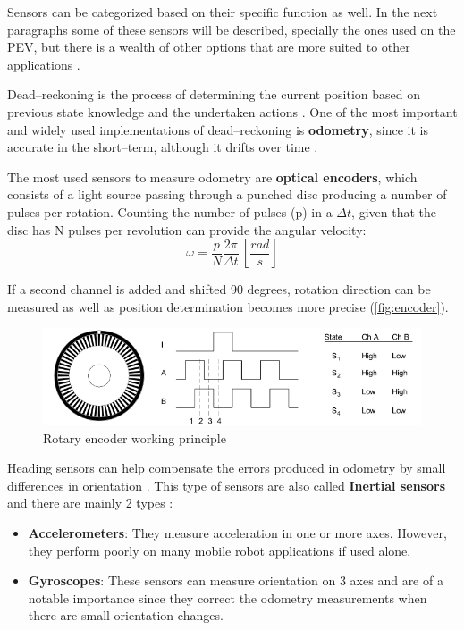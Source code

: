 Sensors can be categorized based on their specific function as well. In the next paragraphs some of these sensors will be described, specially the ones used on the PEV, but there is a wealth of other options that are more suited to other applications .

 Dead--reckoning is the process of determining the current position based on previous state knowledge and the undertaken actions . One of the most important and widely used implementations of dead--reckoning is \textbf{odometry}, since it is accurate in the short--term, although it drifts over time . 

The most used sensors to measure odometry are \textbf{optical encoders}, which consists of a light source passing through a punched disc producing a number of pulses per rotation. Counting the number of pulses (p) in a $\Delta t$, given that the disc has N pulses per revolution can provide the angular velocity:
\begin{equation}
  \omega = \frac{p}{N}\frac{2\pi}{\Delta t}\,\left[\frac{rad}{s}\right]
  \label{eq:odometer}
\end{equation}

If a second channel is added and shifted 90 degrees, rotation direction can be measured as well as position determination becomes more precise (\autoref{fig:encoder}).

\begin{figure}[htb]
  \centering
  \includegraphics[width=\linewidth]{pictures/02/encoder}
  \caption{Rotary encoder working principle}
  \label{fig:encoder}
\end{figure}  

 Heading sensors can help compensate the errors produced in odometry by small differences in orientation . This type of sensors are also called \textbf{Inertial sensors} and there are mainly 2 types :

\begin{itemize}
  \item \textbf{Accelerometers}: They measure acceleration in one or more axes. However, they perform poorly on many mobile robot applications if used alone.

  \item \textbf{Gyroscopes}: These sensors can measure orientation on 3 axes and are of a notable importance since they correct the odometry measurements when there are small orientation changes.
\end{itemize}  

